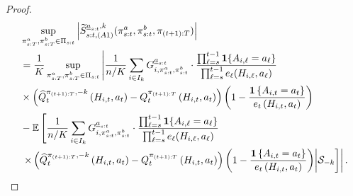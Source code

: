 \begin{proof}
\begin{align*}
     	&\sup_{\pi_{s:T}^{a},\pi_{s:T}^{b}\in \Pi_{s:t}}\left|\widetilde{S}_{s:t,(A1)}^{\underline{a}_{s:t},k}(\pi_{s:t}^{a},\pi_{s:t}^{b},\pi_{(t+1):T})\right|\\
&=	\frac{1}{K}\sup_{\pi_{s:T}^{a},\pi_{s:T}^{b}\in \Pi_{s:t}}\left|\frac{1}{n/K}\sum_{i \in I_k }
G_{i,\pi_{s:t}^{a},\pi_{s:t}^{b}}^{\underline{a}_{s:t}}\cdot\frac{\prod_{\ell=s}^{t-1}\mathbf{1}\{A_{i,\ell}=a_{\ell}\}}{\prod_{\ell=s}^{t-1}e_{\ell}(H_{i,\ell},a_{\ell})}\right.\\
	&\times \left(\widehat{Q}_{t}^{\pi_{(t+1):T},-k}\left(H_{i,t},a_{t}\right)-Q_{t}^{\pi_{(t+1):T}}\left(H_{i,t},a_{t}\right)\right)\left(1-\frac{\mathbf{1}\left\{ A_{i,t}=a_{t}\right\} }{e_{t}\left(H_{i,t},a_{t}\right)}\right) \\
	&-\mathbb{E}\left[\frac{1}{n/K}\sum_{i \in I_k }G_{i,\pi_{s:t}^{a},\pi_{s:t}^{b}}^{\underline{a}_{s:t}}\cdot\frac{\prod_{\ell=s}^{t-1}\mathbf{1}\{A_{i,\ell}=a_{\ell}\}}{\prod_{\ell=s}^{t-1}e_{\ell}(H_{i,\ell},a_{\ell})}\right.\\
	&\left.\left.\times\left(\widehat{Q}_{t}^{\pi_{(t+1):T},-k}\left(H_{i,t},a_{t}\right)-Q_{t}^{\pi_{(t+1):T}}\left(H_{i,t},a_{t}\right)\right)\left(1-\frac{\mathbf{1}\left\{ A_{i,t}=a_{t}\right\} }{e_{t}\left(H_{i,t},a_{t}\right)}\right)\middle|\mathcal{S}_{-k} \right] \right|.
\end{align*}


\end{proof}
